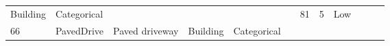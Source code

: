 \documentclass[11pt]{article}
\begin{document}
\begin{longtable}[]{@{}llllllllllll@{}}
\begin{minipage}[t]{0.04\columnwidth}
Building\strut
\end{minipage} & \begin{minipage}[t]{0.04\columnwidth}\raggedright\strut
Categorical\strut
\end{minipage} & \begin{minipage}[t]{0.04\columnwidth}\raggedright\strut
\strut
\end{minipage} & \begin{minipage}[t]{0.04\columnwidth}\raggedright\strut
\strut
\end{minipage} & \begin{minipage}[t]{0.04\columnwidth}\raggedright\strut
\strut
\end{minipage} & \begin{minipage}[t]{0.04\columnwidth}\raggedright\strut
\strut
\end{minipage} & \begin{minipage}[t]{0.04\columnwidth}\raggedright\strut
81\strut
\end{minipage} & \begin{minipage}[t]{0.04\columnwidth}\raggedright\strut
5\strut
\end{minipage} & \begin{minipage}[t]{0.04\columnwidth}\raggedright\strut
Low\strut
\end{minipage}\tabularnewline
\begin{minipage}[t]{0.04\columnwidth}\raggedright\strut
66\strut
\end{minipage} & \begin{minipage}[t]{0.04\columnwidth}\raggedright\strut
PavedDrive\strut
\end{minipage} & \begin{minipage}[t]{0.04\columnwidth}\raggedright\strut
Paved driveway\strut
\end{minipage} & \begin{minipage}[t]{0.04\columnwidth}\raggedright\strut
Building\strut
\end{minipage} & \begin{minipage}[t]{0.04\columnwidth}\raggedright\strut
Categorical\strut
\end{minipage} & \begin{minipage}[t]{0.04\columnwidth}\raggedright\strut
\strut
\end{minipage} & \begin{minipage}[t]{0.04\columnwidth}\raggedright\strut
\strut
\end{minipage} & \begin{minipage}[t]{0.04\columnwidth}\raggedright\strut

\end{minipage}
\end{longtable}
\end{document}
